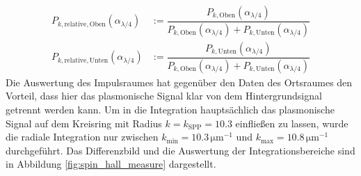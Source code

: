 \documentclass[titlepage,  ngerman]{article}
\begin{document}
		\begin{align}
			\label{eq:relative_power_momentum}
			P_{k, \mathrm{relative}, \mathrm{Oben}}(\alpha_{\lambda/4}) &:= 	\dfrac{P_{k, \mathrm{Oben}}(\alpha_{\lambda/4})}{P_{k, \mathrm{Oben}}(\alpha_{\lambda/4}) + P_{k, \mathrm{Unten}}(\alpha_{\lambda/4})} \\
			\nonumber
			P_{k, \mathrm{relative}, \mathrm{Unten}}(\alpha_{\lambda/4}) &:= 	\dfrac{P_{k, \mathrm{Unten}}(\alpha_{\lambda/4})}{P_{k, \mathrm{Oben}}(\alpha_{\lambda/4}) + P_{k, \mathrm{Unten}}(\alpha_{\lambda/4})}	 	
		\end{align}
		Die Auswertung des Impulsraumes hat gegenüber den Daten des Ortsraumes den Vorteil, dass hier das plasmonische Signal klar von dem Hintergrundsignal getrennt werden kann. Um in die Integration hauptsächlich das plasmonische Signal auf dem Kreisring mit Radius $k = k_\mathrm{SPP} = 10.3$ einfließen zu lassen, wurde die radiale Integration nur zwischen $k_\mathrm{min} = 10.3\,\mathrm{\mu m}^{-1}$ und $k_\mathrm{max} = 10.8\,\mathrm{\mu m}^{-1}$ durchgeführt. Das Differenzbild und die Auswertung der Integrationsbereiche sind in Abbildung \ref{fig:spin_hall_measure} dargestellt.		
\end{document}
